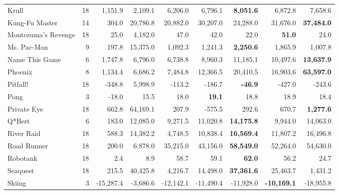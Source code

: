 \begin{table}[t]
\begin{center}
\begin{tabular}{l|rrr|rrr|rr}
               Krull &              18 &    1,151.9 &   2,109.1 &    6,206.0 &    6,796.1 &{\bf8,051.6}&    6,872.8 &      7,658.6 \\
      Kung-Fu Master &              14 &      304.0 &  20,786.8 &   20,882.0 &   30,207.0 &   24,288.0 &   31,676.0 &{\bf37,484.0}\\
 Montezuma's Revenge &              18 &       25.0 &   4,182.0 &       47.0 &       42.0 &       22.0 &{\bf51.0}&         24.0 \\
         Ms. Pac-Man &               9 &      197.8 &  15,375.0 &    1,092.3 &    1,241.3 &{\bf2,250.6}&    1,865.9 &      1,007.8 \\
      Name This Game &               6 &    1,747.8 &   6,796.0 &    6,738.8 &    8,960.3 &   11,185.1 &   10,497.6 &{\bf13,637.9}\\
             Phoenix &               8 &    1,134.4 &   6,686.2 &    7,484.8 &   12,366.5 &   20,410.5 &   16,903.6 &{\bf63,597.0}\\
            Pitfall! &              18 &     -348.8 &   5,998.9 &     -113.2 &     -186.7 &{\bf-46.9}&     -427.0 &       -243.6 \\
                Pong &               3 &      -18.0 &      15.5 &       18.0 &{\bf19.1}&       18.8 &       18.9 &         18.4 \\
         Private Eye &              18 &      662.8 &  64,169.1 &      207.9 &     -575.5 &      292.6 &      670.7 &{\bf1,277.6}\\
              Q*Bert &               6 &      183.0 &  12,085.0 &    9,271.5 &   11,020.8 &{\bf14,175.8}&    9,944.0 &     14,063.0 \\
          River Raid &              18 &      588.3 &  14,382.2 &    4,748.5 &   10,838.4 &{\bf16,569.4}&   11,807.2 &     16,496.8 \\
         Road Runner &              18 &      200.0 &   6,878.0 &   35,215.0 &   43,156.0 &{\bf58,549.0}&   52,264.0 &     54,630.0 \\
            Robotank &              18 &        2.4 &       8.9 &       58.7 &       59.1 &{\bf62.0}&       56.2 &         24.7 \\
            Seaquest &              18 &      215.5 &  40,425.8 &    4,216.7 &   14,498.0 &{\bf37,361.6}&   25,463.7 &      1,431.2 \\
              Skiing &               3 &  -15,287.4 &  -3,686.6 &  -12,142.1 &  -11,490.4 &  -11,928.0 &{\bf-10,169.1}&    -18,955.8 \\

\end{tabular}
\end{center}
\end{table}
